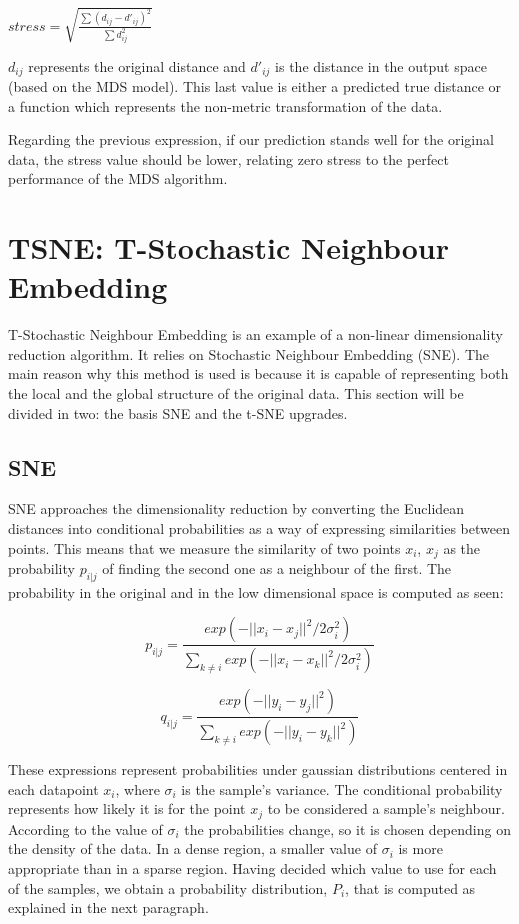 \documentclass[a4paper,11pt,spanish]{report}
\begin{document}
\begin{center}
\( \textit{stress} = \sqrt{\frac{\sum(d_{ij}-d'_{ij})^{2}}{\sum d_{ij}^{2}} } \)
\end{center}

$d_{ij}$ represents the original distance and $d'_{ij}$ is the distance in the output space (based on the MDS model). This last value is either a predicted true distance or a function which represents the non-metric transformation of the data.

Regarding the previous expression, if our prediction stands well for the original data, the stress value should be lower, relating zero stress to the perfect performance of the MDS  algorithm.

\section{TSNE: T-Stochastic Neighbour Embedding}
\label{sec:tsne}

T-Stochastic Neighbour Embedding \citep{tsne} is an example of a non-linear dimensionality reduction algorithm. It relies on Stochastic Neighbour Embedding (SNE). The main reason why this method is used is because it is capable of representing both the local and the global structure of the original data. This section will be divided in two: the basis SNE and the t-SNE upgrades.

\subsection{SNE}
\label{ssec:sne}

SNE approaches the dimensionality reduction by converting the Euclidean distances into conditional probabilities as a way of expressing similarities between points. This means that we measure the similarity of two points $x_{i}$, $x_{j}$ as the probability $p_{i|j}$ of finding the second one as a neighbour of the first. The probability in the original and in the low dimensional space is computed as seen:

$$ p_{i|j} = \frac{exp(-||x_{i}-x_{j}||^{2}/2\sigma_{i}^{2})}{\sum _{k\neq i} exp (-||x_{i}-x_{k}||^{2}/2\sigma_{i}^{2})}$$

$$ q_{i|j} = \frac{exp(-||y_{i}-y_{j}||^{2})}{\sum _{k\neq i} exp (-||y_{i}-y_{k}||^{2})} $$

These expressions represent probabilities under gaussian distributions centered in each datapoint $x_{i}$, where $\sigma_{i}$ is the sample's variance. The conditional probability represents how likely it is for the point $x_{j}$ to be considered a sample's neighbour. According to the value of $\sigma_{i}$ the probabilities change, so it is chosen depending on the density of the data. In a dense region, a smaller value of $\sigma_{i}$ is more appropriate than in a sparse region. Having decided which value to use for each of the samples, we obtain a probability distribution, $P_{i}$, that is computed as explained in the next paragraph.
\end{document}
